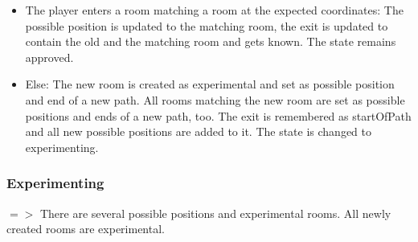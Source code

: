 \documentclass[11pt]{article}
\begin{document}
\begin{itemize}
\begin{itemize}
\item{The player enters a room matching a room at the
expected coordinates:} The possible position is updated to the matching room, the exit is updated
to contain the old and the matching room and gets known. The state remains approved.
\item{Else:} The new room is created as
experimental and set as possible position and end of a new path. All rooms matching the new room are
set as possible positions and ends of a new path, too. The exit is remembered
as startOfPath and all new possible positions are added to it. The state is changed to
experimenting.
\end{itemize}
\end{itemize}
\subsubsection{Experimenting}
$=>$ There are several possible positions and experimental rooms. All newly created rooms are experimental.
\end{document}

